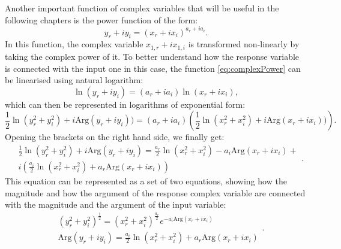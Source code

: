 \documentclass[
]{book}
\begin{document}
Another important function of complex variables that will be useful in the following chapters is the power function of the form:
\begin{equation}
    y_r + i y_i = (x_{r} + i x_{i}) ^{a_{r} + i a_{i}} .
    \label{eq:complexPower}
\end{equation}
In this function, the complex variable \(x_{1,r} + i x_{1,i}\) is transformed non-linearly by taking the complex power of it. To better understand how the response variable is connected with the input one in this case, the function \eqref{eq:complexPower} can be linearised using natural logarithm:
\begin{equation*}
    \ln (y_r + i y_i) = (a_{r} + i a_{i}) \ln (x_{r} + i x_{i}) ,
\end{equation*}
which can then be represented in logarithms of exponential form:
\begin{equation*}
    \frac{1}{2} \ln \left({y_r^2 + y_i^2}\right) + {i \mathrm{Arg}(y_r + i y_i)}) = (a_{r} + i a_{i}) \left(\frac{1}{2} \ln \left({x_r^2 + x_i^2}\right) + {i \mathrm{Arg}(x_r + i x_i)})\right) .
\end{equation*}
Opening the brackets on the right hand side, we finally get:
\begin{equation*}
    \begin{aligned}
    & \frac{1}{2} \ln \left({y_r^2 + y_i^2}\right) + {i \mathrm{Arg}(y_r + i y_i)} = \frac{a_{r}}{2} \ln \left({x_r^2 + x_i^2}\right) - a_{i} \mathrm{Arg}(x_r + i x_i) + \\
    & i \left(\frac{a_{i}}{2} \ln \left({x_r^2 + x_i^2}\right) + a_r \mathrm{Arg}(x_r + i x_i)  \right) 
    \end{aligned} .
\end{equation*}
This equation can be represented as a set of two equations, showing how the magnitude and how the argument of the response complex variable are connected with the magnitude and the argument of the input variable:
\begin{equation}
    \begin{aligned}
        & \left({y_r^2 + y_i^2}\right)^{\frac{1}{2}} = \left({x_r^2 + x_i^2}\right)^{\frac{a_{r}}{2}} e^{- a_{i} \mathrm{Arg}(x_r + i x_i)} \\
        & \mathrm{Arg}(y_r + i y_i) = \frac{a_{i}}{2} \ln \left({x_r^2 + x_i^2}\right) + a_r \mathrm{Arg}(x_r + i x_i)
    \end{aligned} .
    \label{eq:complexPowerLogs}
\end{equation}
\end{document}
